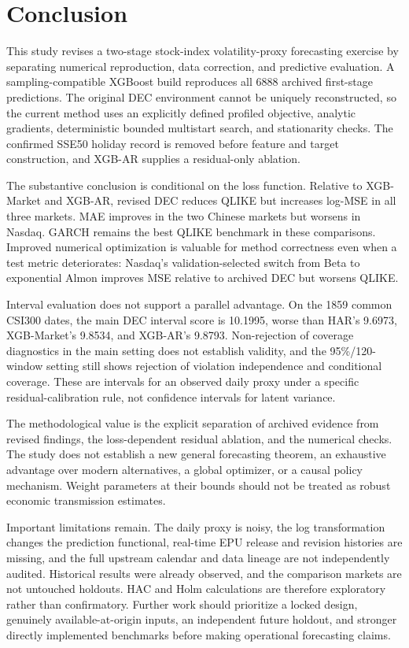 \section{Conclusion}
This study revises a two-stage stock-index volatility-proxy forecasting exercise by separating numerical reproduction, data correction, and predictive evaluation. A sampling-compatible XGBoost build reproduces all 6888 archived first-stage predictions. The original DEC environment cannot be uniquely reconstructed, so the current method uses an explicitly defined profiled objective, analytic gradients, deterministic bounded multistart search, and stationarity checks. The confirmed SSE50 holiday record is removed before feature and target construction, and XGB-AR supplies a residual-only ablation.

The substantive conclusion is conditional on the loss function. Relative to XGB-Market and XGB-AR, revised DEC reduces QLIKE but increases log-MSE in all three markets. MAE improves in the two Chinese markets but worsens in Nasdaq. GARCH remains the best QLIKE benchmark in these comparisons. Improved numerical optimization is valuable for method correctness even when a test metric deteriorates: Nasdaq's validation-selected switch from Beta to exponential Almon improves MSE relative to archived DEC but worsens QLIKE.

Interval evaluation does not support a parallel advantage. On the 1859 common CSI300 dates, the main DEC interval score is 10.1995, worse than HAR's 9.6973, XGB-Market's 9.8534, and XGB-AR's 9.8793. Non-rejection of coverage diagnostics in the main setting does not establish validity, and the 95\%/120-window setting still shows rejection of violation independence and conditional coverage. These are intervals for an observed daily proxy under a specific residual-calibration rule, not confidence intervals for latent variance.

The methodological value is the explicit separation of archived evidence from revised findings, the loss-dependent residual ablation, and the numerical checks. The study does not establish a new general forecasting theorem, an exhaustive advantage over modern alternatives, a global optimizer, or a causal policy mechanism. Weight parameters at their bounds should not be treated as robust economic transmission estimates.

Important limitations remain. The daily proxy is noisy, the log transformation changes the prediction functional, real-time EPU release and revision histories are missing, and the full upstream calendar and data lineage are not independently audited. Historical results were already observed, and the comparison markets are not untouched holdouts. HAC and Holm calculations are therefore exploratory rather than confirmatory. Further work should prioritize a locked design, genuinely available-at-origin inputs, an independent future holdout, and stronger directly implemented benchmarks before making operational forecasting claims.
